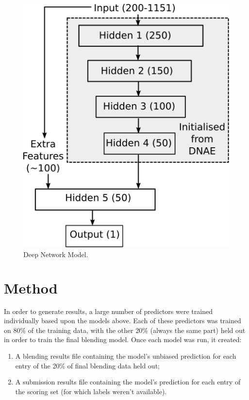 \documentclass{article}
\begin{document}
\begin{figure}[ht]
\vskip 0.2in
\begin{center}
\centerline{\includegraphics{deepnet}}
\caption{Deep Network Model.}
\label{figure:deepnet}
\end{center}
\vskip -0.2in
\end{figure} 

\section{Method}

In order to generate results, a large number of predictors were trained individually based upon the models above.  Each of these predictors was trained on 80\% of the training data, with the other 20\% (always the same part) held out in order to train the final blending model.  Once each model was run, it created:

\begin{enumerate}
\item A blending results file containing the model's unbiased prediction for each entry of the 20\% of final blending data held out;
\item A submission results file containing the model's prediction for each entry of the scoring set (for which labels weren't available).
\end{enumerate}
\end{document}
